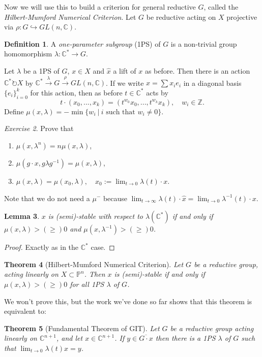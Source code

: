 \documentclass{article}
\newtheorem{theorem}{Theorem}
\newtheorem{lemma}[theorem]{Lemma}
\theoremstyle{definition}
\newtheorem{definition}[theorem]{Definition}
\theoremstyle{remark}
\newtheorem{exercise}[theorem]{Exercise}
\numberwithin{theorem}{section}
\newcommand{\C}{\mathbb{C}}
\newcommand{\bP}{\mathbb{P}}
\newenvironment{thm}{
\begin{mdframed}
	\vspace{-0.5em}
	\begin{theorem}
}{
	\end{theorem}
\end{mdframed}
}
\newenvironment{defn}{
	\begin{mdframed}
		\vspace{-0.5em}
		\begin{definition}
		}{
		\end{definition}
	\end{mdframed}
}
\begin{document}
	Now we will use this to build a criterion for general reductive $G$, called the \emph{Hilbert-Mumford Numerical Criterion}. Let $G$ be reductive acting on $X$ projective via $\rho:G\hookrightarrow GL(n,\C)$.
	\begin{defn}
		A \emph{one-parameter subgroup} (1PS) of $G$ is a non-trivial group homomorphism $\lambda:\C^\ast\to G$. 
	\end{defn}
	Let $\lambda$ be a 1PS of $G$, $x\in X$ and $\hat{x}$ a lift of $x$ as before. Then there is an action $\C^\ast \circlearrowright X$ by $\C^\ast\xrightarrow{\lambda} G\xrightarrow{\rho} GL(n,\C)$. If we write $x=\sum x_ie_i$ in a diagonal basis $\{e_i\}_{i=0}^{k}$ for this action, then as before $t\in\C^\ast$ acts by 
	\begin{equation}
		t\cdot(x_0,...,x_{k}) = (t^{w_0}x_0,...,t^{w_k}x_k),\quad w_i\in\mathbb{Z}.
	\end{equation}
	Define $\mu(x,\lambda)=-\min\{w_i ~|~ i \text{ such that } w_i\neq 0\}$. 
	\begin{exercise}
		Prove that
		\begin{enumerate}
			\item $\mu(x,\lambda^n) = n\mu(x,\lambda)$,
			\item $\mu(g\cdot x, g\lambda g^{-1}) = \mu(x,\lambda)$,
			\item $\mu(x,\lambda) = \mu(x_0,\lambda), \quad x_0:=\lim_{t\to0} \lambda(t)\cdot x$.
		\end{enumerate}
	\end{exercise}
	Note that we do not need a $\mu^-$ because $\lim_{t\to\infty}\lambda(t)\cdot \hat{x} = \lim_{t\to0} \lambda^{-1}(t)\cdot{x}$.
	\begin{lemma}
		$x$ is (semi)-stable with respect to $\lambda(\C^\ast)$ if and only if $\mu(x,\lambda)>(\geq)0$ and $\mu(x,\lambda^{-1})>(\geq)0$.
	\end{lemma}
	\begin{proof}
		Exactly as in the $\C^\ast$ case.
	\end{proof}
	\begin{thm}[Hilbert-Mumford Numerical Criterion]
		Let $G$ be a reductive group, acting linearly on $X\subset \bP^n$. Then $x$ is (semi)-stable if and only if $\mu(x,\lambda)>(\geq)0$ for all 1PS $\lambda$ of $G$.
	\end{thm}
	We won't prove this, but the work we've done so far shows that this theorem is equivalent to:
	\begin{thm}[Fundamental Theorem of GIT]
		Let $G$ be a reductive group acting linearly on $\C^{n+1}$, and let $x\in\C^{n+1}$. If $y\in\overline{G\cdot x}$ then there is a 1PS $\lambda$ of $G$ such that $\lim_{t\to 0}\lambda(t)x=y$. 
	\end{thm}
\end{document}

